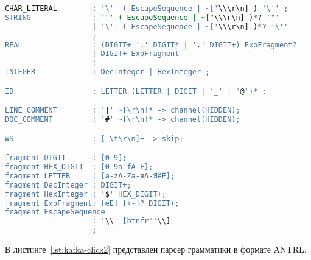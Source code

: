 \begin{lstlisting}[language=sql, caption={Лексер грамматики в формате ANTRL}, label=lst:kafka-click]
CHAR_LITERAL        : '\'' ( EscapeSequence | ~['\\\r\n] ) '\'' ;
STRING              : '"' ( EscapeSequence | ~["\\\r\n] )*? '"'
                    | '\'' ( EscapeSequence | ~['\\\r\n] )*? '\''
                    ;
REAL                : (DIGIT+ '.' DIGIT* | '.' DIGIT+) ExpFragment?
                    | DIGIT+ ExpFragment
                    ;
INTEGER             : DecInteger | HexInteger ;

ID                  : LETTER (LETTER | DIGIT | '_' | '@')* ;

LINE_COMMENT        : '|' ~[\r\n]* -> channel(HIDDEN);
DOC_COMMENT         : '#' ~[\r\n]* -> channel(HIDDEN);

WS                  : [ \t\r\n]+ -> skip;

fragment DIGIT      : [0-9];
fragment HEX_DIGIT  : [0-9a-fA-F];
fragment LETTER     : [a-zA-Zа-яА-ЯёЁ];
fragment DecInteger : DIGIT+;
fragment HexInteger : '$' HEX_DIGIT+;
fragment ExpFragment: [eE] [+-]? DIGIT+;
fragment EscapeSequence
                    : '\\' [btnfr"'\\]
                    ;
\end{lstlisting}

В листинге~\ref{lst:kafka-click2} представлен парсер грамматики в формате ANTRL.

